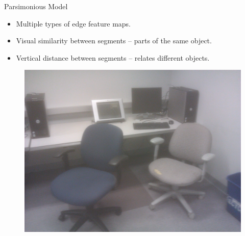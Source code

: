 \documentclass{beamer}
\newcommand{\fe}[3]{{\phi_{#1}(#2,#3)}}%
\newcommand{\we}[3]{{w_{#1}^{#2#3}}}   %
\begin{document}

\begin{frame}{Parsimonious Model}

\begin{itemize}

\item Multiple types of edge feature maps.

\item Visual similarity between segments -- parts of the same object.
\item Vertical distance between segments -- relates different objects.

\end{itemize}
\begin{figure}[t!]
\includegraphics[width=.5\linewidth]{parsi.jpg}
\end{figure}



\end{frame}
\end{document}
